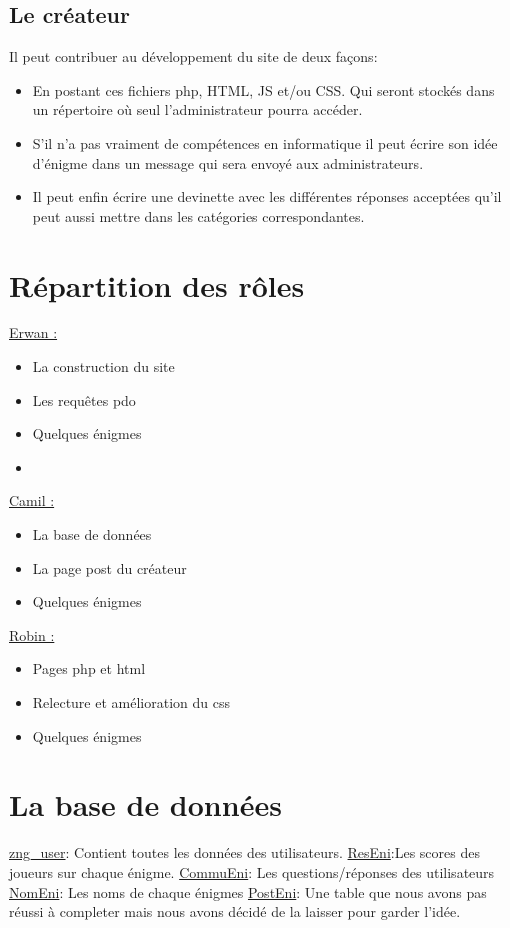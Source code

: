 \documentclass[a4paper, 11pt]{article}
\begin{document}
\subsection{Le créateur}
Il peut contribuer au développement du site de deux façons:
\begin{itemize}
\item En postant ces fichiers php, HTML, JS et/ou CSS. Qui seront stockés dans un répertoire où seul l’administrateur pourra accéder.
\item S'il n'a pas vraiment de compétences en informatique il peut écrire son idée d'énigme dans un message qui sera envoyé aux administrateurs.
\item Il peut enfin écrire une devinette avec les différentes réponses acceptées qu'il peut aussi mettre dans les catégories correspondantes.
\end{itemize}

\section{Répartition des rôles}

\underline{Erwan :}
\begin{itemize}
\item La construction du site
\item Les requêtes pdo
\item Quelques énigmes
\item 
\end{itemize}

\underline{Camil :}
\begin{itemize}
\item La base de données
\item La page post du créateur
\item Quelques énigmes
\end{itemize}

\underline{Robin :}
\begin{itemize}
\item Pages php et html
\item Relecture et amélioration du css
\item Quelques énigmes
\end{itemize}

\section{La base de données}
\underline{zng_user}: Contient toutes les données des utilisateurs.
\underline{ResEni}:Les scores des joueurs sur chaque énigme.
\underline{CommuEni}: Les questions/réponses des utilisateurs
\underline{NomEni}: Les noms de chaque énigmes
\underline{PostEni}: Une table que nous avons pas réussi à completer mais nous avons décidé de la laisser pour garder l'idée.
\end{document}
